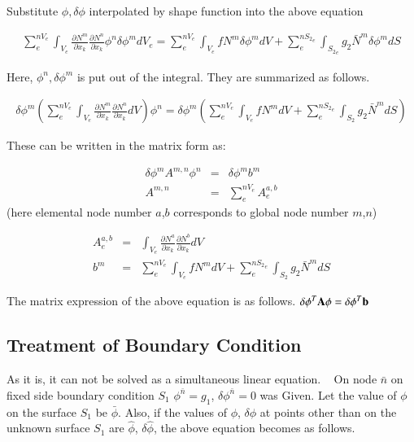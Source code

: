 Substitute $\phi,\delta\phi$ interpolated by shape function into the above equation

\begin{eqnarray}
\sum_{e}^{nV_e}\int_{V_e}\frac{\partial N^m}{\partial x_k}\frac{\partial N^n}{\partial x_k}\phi^n \delta\phi^m dV_e
= \sum_{e}^{nV_e}\int_{V_e} f N^m \delta\phi^m dV + \sum_{e}^{{nS_2}_e}\int_{{S_2}_e} g_2 \bar{N}^m \delta\phi^m dS
\end{eqnarray}


Here, $\phi^n, \delta \phi^m$ is put out of the integral. They are summarized as follows.

\begin{eqnarray}
\delta\phi^m  \left(  \sum_{e}^{nV_e}\int_{V_e}\frac{\partial N^m}{\partial x_k}\frac{\partial N^n}{\partial x_k}dV  \right) \phi^n   =  \delta\phi^m  \left(  \sum_{e}^{nV_e}\int_{V_e} f N^m  dV  +  \sum_{e}^{{nS_2}_e}\int_{S_2} g_2 \bar{N}^m  dS  \right)
\end{eqnarray}


These can be written in the matrix form as:
%
\begin{tcolorbox}[title=discretized poission equation in weak form]
\begin{eqnarray}
\delta\phi^mA^{m,n}\phi^n &=& \delta\phi^mb^m\\
A^{m,n} &=& \sum_{e}^{nV_e}A_e^{a,b}
\end{eqnarray}
 (here elemental node number $a$,$b$ corresponds to global node number $m$,$n$)
\end{tcolorbox}

\begin{tcolorbox}[title=element-wise stiffness matrix]
\begin{eqnarray}
A_e^{a,b} &=& \int_{V_e}\frac{\partial N^a}{\partial x_k}\frac{\partial N^b}{\partial x_k}dV\\
b^{m} &=& \sum_{e}^{nV_e}\int_{V_e} f N^m  dV + \sum_{e}^{{nS_2}_e}\int_{S_2} g_2 \bar{N}^m  dS
 \end{eqnarray}
\end{tcolorbox}

The matrix expression of the above equation is as follows. $\delta\mathbf{\phi}^T\mathbf{A}\mathbf{\phi}=\delta\mathbf{\phi}^T\mathbf{b}$


\subsection{Treatment of Boundary Condition}

As it is, it can not be solved as a simultaneous linear equation. ~
On node $\bar{n}$ on fixed side boundary condition $S_1$ $\phi^{\bar{n}}=g_1$, $\delta\phi^{\bar{n}}=0$ was Given. Let the value of $\phi$ on the surface $S_1$ be $\bar{\phi}$.
Also, if the values ​​of $\phi$, $\delta\phi$ at points other than on the unknown surface $S_1$ are $\hat{\phi}$, $\delta\hat{\phi}$, the above equation becomes as follows.

